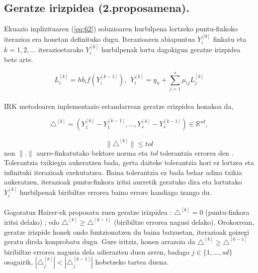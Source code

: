 \subsection{Geratze irizpidea (2.proposamena).}

Ekuazio inplizituaren (\ref{eq:62}) soluzioaren hurbilpena lortzeko puntu-finkoko iterazioa era honetan definituko dugu. Iterazioaren abiapuntua $Y_i^{[0]}$  finkatu eta $k=1,2,\dots$ iterazioetarako $Y_i^{[k]}$ hurbilpenak lortu dagokigun geratze irizpidea bete arte.

\begin{equation}
L_i^{[k]}=hb_if(Y_i^{[k-1]}), \ \ Y_i^{[k]}=y_n+\sum\limits_{j=1}^{s} \mu_{ij} L_j^{[k]}
\end{equation}
 
\paragraph*{}IRK metodoaren inplementazio estandarrean geratze erizpidea honakoa da,

\begin{equation*}
\triangle^{[k]}=(Y_1^{[k]}-Y_1^{[k-1]},\dots,Y_s^{[k]}-Y_s^{[k-1]}) \in \mathbb{R}^{sd},
\end{equation*}
 
\begin{equation}
\|\triangle^{[k]}\| \le tol
\end{equation}
non $\|.\|$ aurre-finkatutako bektore norma eta \emph{tol} tolerantzia errorea den . Tolerantzia txikiegia aukeratzen bada, gerta daiteke tolerantzia hori ez lortzea eta infinituki iterazioak exekutatzea. Baina tolerantzia ez bada behar adina txikia  aukeratzen, iterazioak puntu-finkora iritsi aurretik geratuko dira eta lortutako $Y_i^{[k]}$ hurbilpenak biribiltze errorea baino errore handiago izango du.

\paragraph*{} Gogoratuz Hairer-ek proposatu zuen geratze irizpidea :  $\triangle^{[k]} = 0$ (puntu-finkora iritsi delako) ;  edo   $\triangle^{[k]} \geqslant \triangle^{[k-1]}$ (biribiltze errorea nagusi delako). Orokorrean, geratze irizpide honek ondo funtzionatzen du baina batzuetan, iterazioak goizegi geratu direla konprobatu dugu. Gure iritziz, honen arrazoia da $\triangle^{[k]} \geqslant \triangle^{[k-1]}$ biribiltze errorea nagusia dela adierazten duen arren, badago $j \in \{1,\dots,sd\}$ osagairik,   $|\triangle_j^{[k]}| < |\triangle_j^{[k-1]}|$ hobetzeko tartea duena. 


